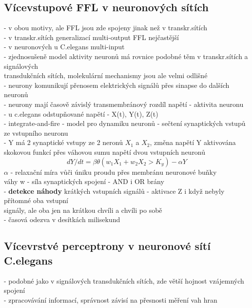 \documentclass[11pt,a4paper]{report}
\begin{document}
\subsection{Vícevstupové FFL v neuronových sítích}
- v obou motivy, ale FFL jsou zde spojeny jinak než v transkr.sítích\\
\indent - v transkr.sítích generalizací multi-output FFL nejčastější\\
\indent - v neuronových u C.elegans multi-input\\
- zjednosušeně model aktivity neuronů má rovnice podobné těm v transkr.sítích a signálových\\
\indent transdukčních sítích, molekulární mechanismy jsou ale velmi odlišné\\
- neurony komunikují přenosem elektrických signálů přes sinapse do dalších neuronů\\
- neurony mají časově závislý transmembránový rozdíl napětí - aktivita neuronu\\
- u c.elegans odstupňované napětí - X(t), Y(t), Z(t)\\
- integrate-and-fire - model pro dynamiku neuronů - sečtení synaptických vstupů ze vstupního neuronu\\
- Y má 2 synaptické vstupy ze 2 neronů $X_1$ a $X_2$, změna napětí Y aktivována skokovou funkcí přes váhovou sumu napětí dvou vstupních neuronů\\
\begin{equation}
dY/dt=\beta\theta(w_1X_1+w_2X_2>K_y)-\alpha Y
\end{equation}
\indent $\alpha$ - relaxační míra vůči úniku proudu přes membránu neuronové buňky\\
\indent váhy w - síla synaptických spojení
\indent - AND i OR brány\\
- \textbf{detekce náhody} krátkých vstupních signálů - aktivace Z i když nebyly přítomné oba vstupní\\
\indent signály, ale oba jen na krátkou chvíli a chvíli po sobě\\
- časová odezva v desítkách milisekund\\

\subsection{Vícevrstvé perceptrony v neuronové sítí C.elegans}
- podobné jako v signálových transdukčních sítích, zde větší hojnost vzájemných spojení\\
- zpracovávání informací, správnost závisí na přesnosti měření vah hran\\
\end{document}
